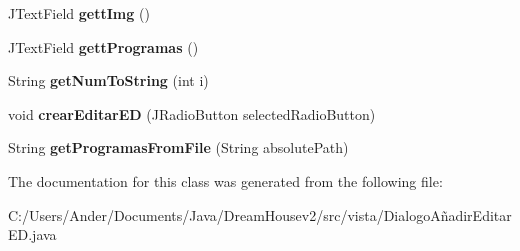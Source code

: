 \begin{DoxyCompactItemize}
J\+Text\+Field {\bfseries gett\+Img} ()
\item 
\mbox{\label{classvista_1_1_dialogo_a_xC3_xB1adir_editar_e_d_a06aa02b72b0bb66faa5816e091c54e85}} 
J\+Text\+Field {\bfseries gett\+Programas} ()
\item 
\mbox{\label{classvista_1_1_dialogo_a_xC3_xB1adir_editar_e_d_a57f13abe4c17f09f1d1cccdef6644697}} 
String {\bfseries get\+Num\+To\+String} (int i)
\item 
\mbox{\label{classvista_1_1_dialogo_a_xC3_xB1adir_editar_e_d_a4cc6d5bf23ff4ea275fd32b49cd4572a}} 
void {\bfseries crear\+Editar\+ED} (J\+Radio\+Button selected\+Radio\+Button)
\item 
\mbox{\label{classvista_1_1_dialogo_a_xC3_xB1adir_editar_e_d_aed9f1d25c1f24e37ced26ef7025b2b01}} 
String {\bfseries get\+Programas\+From\+File} (String absolute\+Path)
\end{DoxyCompactItemize}


The documentation for this class was generated from the following file\+:\begin{DoxyCompactItemize}
\item 
C\+:/\+Users/\+Ander/\+Documents/\+Java/\+Dream\+Housev2/src/vista/Dialogo\+Añadir\+Editar\+E\+D.\+java\end{DoxyCompactItemize}
